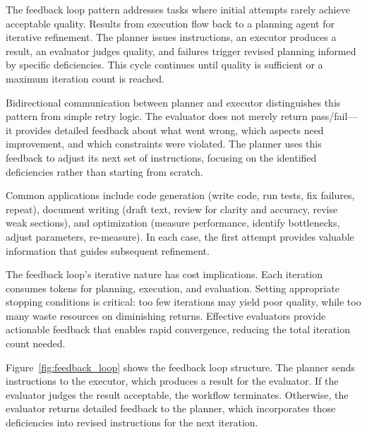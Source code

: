 The feedback loop pattern addresses tasks where initial attempts rarely achieve acceptable quality.
Results from execution flow back to a planning agent for iterative refinement.
The planner issues instructions, an executor produces a result, an evaluator judges quality, and failures trigger revised planning informed by specific deficiencies.
This cycle continues until quality is sufficient or a maximum iteration count is reached.

Bidirectional communication between planner and executor distinguishes this pattern from simple retry logic.
The evaluator does not merely return pass/fail---it provides detailed feedback about what went wrong, which aspects need improvement, and which constraints were violated.
The planner uses this feedback to adjust its next set of instructions, focusing on the identified deficiencies rather than starting from scratch.

Common applications include code generation (write code, run tests, fix failures, repeat), document writing (draft text, review for clarity and accuracy, revise weak sections), and optimization (measure performance, identify bottlenecks, adjust parameters, re-measure).
In each case, the first attempt provides valuable information that guides subsequent refinement.

The feedback loop's iterative nature has cost implications.
Each iteration consumes tokens for planning, execution, and evaluation.
Setting appropriate stopping conditions is critical: too few iterations may yield poor quality, while too many waste resources on diminishing returns.
Effective evaluators provide actionable feedback that enables rapid convergence, reducing the total iteration count needed.

Figure~\ref{fig:feedback_loop} shows the feedback loop structure.
The planner sends instructions to the executor, which produces a result for the evaluator.
If the evaluator judges the result acceptable, the workflow terminates.
Otherwise, the evaluator returns detailed feedback to the planner, which incorporates those deficiencies into revised instructions for the next iteration.

